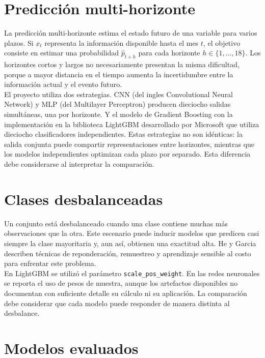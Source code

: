 \section{Predicción multi-horizonte}

La predicción multi-horizonte estima el estado futuro de una variable para varios plazos. Si $x_t$ representa la información disponible hasta el mes $t$, el objetivo consiste en estimar una probabilidad $\hat{p}_{t+h}$ para cada horizonte $h \in \{1, \ldots, 18\}$. Los horizontes cortos y largos no necesariamente presentan la misma dificultad, porque a mayor distancia en el tiempo aumenta la incertidumbre entre la información actual y el evento futuro.\\

El proyecto utiliza dos estrategias. CNN (del ingles Convolutional Neural Network) y MLP (del Multilayer Perceptron) producen dieciocho salidas simultáneas, una por horizonte. Y el modelo de Gradient Boosting con la implementación en la biblioteca LightGBM desarrollado por Microsoft que utiliza dieciocho clasificadores independientes. Estas estrategias no son idénticas: la salida conjunta puede compartir representaciones entre horizontes, mientras que los modelos independientes optimizan cada plazo por separado. Esta diferencia debe considerarse al interpretar la comparación.

\section{Clases desbalanceadas}

Un conjunto está desbalanceado cuando una clase contiene muchas más observaciones que la otra. Este escenario puede inducir modelos que predicen casi siempre la clase mayoritaria y, aun así, obtienen una exactitud alta. He y Garcia \cite{he2009learning} describen técnicas de reponderación, remuestreo y aprendizaje sensible al costo para enfrentar este problema.\\

En LightGBM se utilizó el parámetro \texttt{scale\_pos\_weight}. En las redes neuronales se reporta el uso de pesos de muestra, aunque los artefactos disponibles no documentan con suficiente detalle su cálculo ni su aplicación. La comparación debe considerar que cada modelo puede responder de manera distinta al desbalance.

\section{Modelos evaluados}

